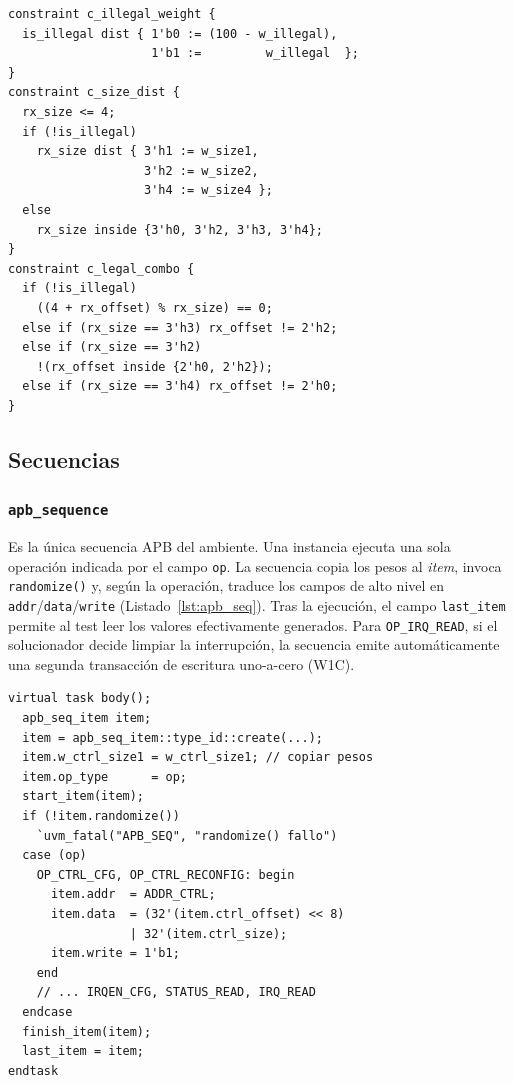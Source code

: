 \documentclass[conference]{IEEEtran}
\begin{document}
\begin{lstlisting}[caption={Restricciones ponderadas en \texttt{md\_seq\_item}},label={lst:md_constraints}]
constraint c_illegal_weight {
  is_illegal dist { 1'b0 := (100 - w_illegal),
                    1'b1 :=         w_illegal  };
}
constraint c_size_dist {
  rx_size <= 4;
  if (!is_illegal)
    rx_size dist { 3'h1 := w_size1,
                   3'h2 := w_size2,
                   3'h4 := w_size4 };
  else
    rx_size inside {3'h0, 3'h2, 3'h3, 3'h4};
}
constraint c_legal_combo {
  if (!is_illegal)
    ((4 + rx_offset) % rx_size) == 0;
  else if (rx_size == 3'h3) rx_offset != 2'h2;
  else if (rx_size == 3'h2)
    !(rx_offset inside {2'h0, 2'h2});
  else if (rx_size == 3'h4) rx_offset != 2'h0;
}
\end{lstlisting}

\subsection{Secuencias}
\subsubsection{\texttt{apb\_sequence}}
Es la única secuencia APB del ambiente. Una instancia ejecuta una sola operación
indicada por el campo \texttt{op}. La secuencia copia los pesos al \textit{item},
invoca \texttt{randomize()} y, según la operación, traduce los campos de alto
nivel en \texttt{addr}/\texttt{data}/\texttt{write}
(Listado~\ref{lst:apb_seq}). Tras la ejecución, el campo \texttt{last\_item}
permite al test leer los valores efectivamente generados. Para
\texttt{OP\_IRQ\_READ}, si el solucionador decide limpiar la interrupción, la
secuencia emite automáticamente una segunda transacción de escritura uno-a-cero
(W1C).

\begin{lstlisting}[caption={Cuerpo de la secuencia APB unificada},label={lst:apb_seq}]
virtual task body();
  apb_seq_item item;
  item = apb_seq_item::type_id::create(...);
  item.w_ctrl_size1 = w_ctrl_size1; // copiar pesos
  item.op_type      = op;
  start_item(item);
  if (!item.randomize())
    `uvm_fatal("APB_SEQ", "randomize() fallo")
  case (op)
    OP_CTRL_CFG, OP_CTRL_RECONFIG: begin
      item.addr  = ADDR_CTRL;
      item.data  = (32'(item.ctrl_offset) << 8)
                 | 32'(item.ctrl_size);
      item.write = 1'b1;
    end
    // ... IRQEN_CFG, STATUS_READ, IRQ_READ
  endcase
  finish_item(item);
  last_item = item;
endtask
\end{lstlisting}
\end{document}

